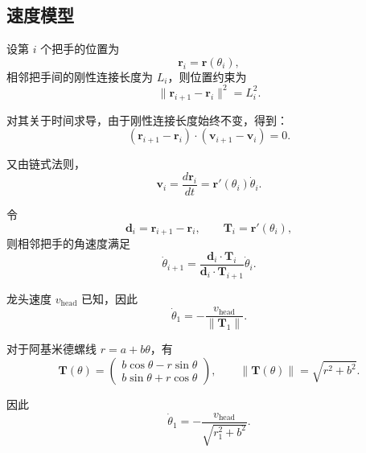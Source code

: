 \subsection{速度模型}

设第 $i$ 个把手的位置为
\begin{equation}
    \mathbf{r}_i=\mathbf{r}(\theta_i),
\end{equation}
相邻把手间的刚性连接长度为 $L_i$，则位置约束为
\begin{equation}
    \|\mathbf{r}_{i+1}-\mathbf{r}_i\|^2=L_i^2.
\end{equation}

对其关于时间求导，由于刚性连接长度始终不变，得到：
\begin{equation}
    (\mathbf{r}_{i+1}-\mathbf{r}_i)
    \cdot
    (\mathbf{v}_{i+1}-\mathbf{v}_i)=0.
\end{equation}

又由链式法则，
\begin{equation}
\mathbf{v}_i = \frac{d\mathbf{r}_i}{dt} = \mathbf{r}'(\theta_i)\dot\theta_i.
\end{equation}

令
\begin{equation}
    \mathbf{d}_i=\mathbf{r}_{i+1}-\mathbf{r}_i,
    \qquad
    \mathbf{T}_i=\mathbf{r}'(\theta_i),
\end{equation}
则相邻把手的角速度满足
\begin{equation}
    \dot{\theta}_{i+1}
    =
    \frac{\mathbf{d}_i\cdot\mathbf{T}_i}
    {\mathbf{d}_i\cdot\mathbf{T}_{i+1}}
    \dot{\theta}_i.
\end{equation}

龙头速度 $v_{\mathrm{head}}$ 已知，因此
\begin{equation}
    \dot{\theta}_1
    =
    -\frac{v_{\mathrm{head}}}
    {\|\mathbf{T}_1\|}.
\end{equation}

对于阿基米德螺线 $r=a+b\theta$，有
\begin{equation}
    \mathbf{T}(\theta)
    =
    \begin{pmatrix}
        b\cos\theta-r\sin\theta\\
        b\sin\theta+r\cos\theta
    \end{pmatrix},
    \qquad
    \|\mathbf{T}(\theta)\|=\sqrt{r^2+b^2}.
\end{equation}

因此
\begin{equation}
    \dot{\theta}_1
    =
    -\frac{v_{\mathrm{head}}}
    {\sqrt{r_1^2+b^2}}.
\end{equation}

